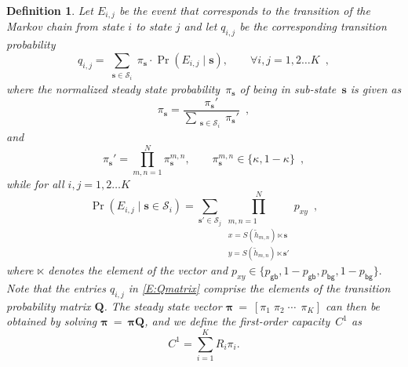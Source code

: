\documentclass[10pt,conference]{IEEEtran}
\newtheorem{defn}[theorem]{Definition}
\newcommand{\rate}{R}
\begin{document}
\begin{defn}

Let $ E_{i,j} $ be the event that corresponds to the transition of the Markov chain from state $i$ to state $j$ and let $q_{i,j}$ be the corresponding transition probability \begin{equation}\label{E:Qmatrix}
q_{i,j} = \sum_{ \substack {\mathbf{s} \in \mathcal{S}_i } } \pi_{\mathbf{s}}  \cdot  \Pr \left( E_{i,j}\mid \mathbf{s} \right ), \qquad \forall i,j=1,2\ldots K \enspace,
\end{equation}
where the normalized steady state probability~$\pi_{\mathbf{s}}$ of being in sub-state~$\mathbf{s}$ is given as
\begin{equation}\label{E:steady_Prob_substate_unnorm}
	\pi_{\mathbf{s}} = \frac{	\pi_{\mathbf{s}}' }  { \sum_{ \substack {\mathbf{s} \in \mathcal{S}_i } } \pi_{\mathbf{s}}' }\enspace,
\end{equation}
and
\begin{equation}\label{E:steady_Prob_substate}
	\pi_{\mathbf{s}}' = \prod^{N}_{m,n=1} \pi_{\mathbf{s}}^{m,n},  \qquad \pi_{\mathbf{s}}^{m,n} \in \{\kappa,1-\kappa\}\enspace,
\end{equation}
while for all $i,j=1,2\ldots K$
\begin{equation}\label{E:QProb_Cond}
\Pr \left (E_{i,j}\mid \mathbf{s} \in \mathcal{S}_i \right)  = \sum_{\mathbf{s}' \in \mathcal{S}_j }
\prod_{ \substack{m,n=1\\x = S(\widetilde{h}_{m,n})\ltimes \mathbf{s}\\ y = S(\widetilde{h}_{m,n}) \ltimes \mathbf{s}'} }^{N}
p_{x y} \enspace, \end{equation}
where $\ltimes$ denotes the element of the vector
and
$p_{xy} \in \{ p_{\mathsf{gb}},1-p_{\mathsf{gb}}, p_{\mathsf{bg}}, 1 -p_{\mathsf{bg}}  \}.$ Note that the entries $q_{i,j}$ in \eqref{E:Qmatrix} comprise the elements of the transition probability matrix $\mathbf{Q}$.
The steady state vector $ \boldsymbol{\pi}~=~\left[ \pi_1 \; \pi_2 \;\cdots\,\;\pi_K \right] $ can then be obtained by solving $\boldsymbol{\pi}~=~\boldsymbol{\pi}  \mathbf{Q}$, and we define the first-order capacity~$C^1$ as
\begin{equation}
C^1=\sum_{i=1}^K \rate_i\pi_i .
\label{E:first_order_cap}
\end{equation}


\end{defn}
\end{document}
